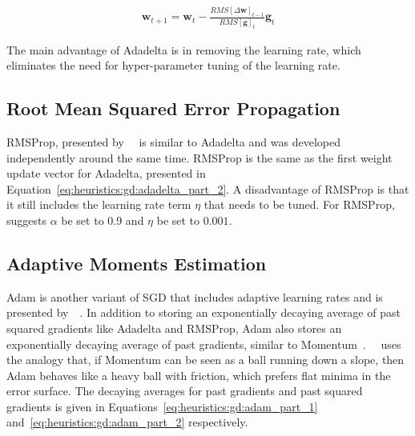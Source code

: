 \begin{equation}
	\label{eq:heuristics:gd:adadelta_part_6}
	\begin{split}
		\boldsymbol{w}_{t+1} = \boldsymbol{w}_{t} - \frac{RMS[\Delta \boldsymbol{w}]_{t-1}}{RMS[\boldsymbol{g}]_{t}} \boldsymbol{g}_{t}
	\end{split}
\end{equation}

The main advantage of \acs{Adadelta} is in removing the learning rate, which eliminates the need for hyper-parameter tuning of the learning rate.

\subsection{Root Mean Squared Error Propagation}\label{sec:heuristics:rmsprop}

\Acf{RMSProp}, presented by~\citeauthor{ref:hinton:2012}~\cite{ref:hinton:2012} is similar to \acs{Adadelta}  and was developed independently around the same time. \acs{RMSProp} is the same as the first weight update vector for \acs{Adadelta}, presented in Equation~\eqref{eq:heuristics:gd:adadelta_part_2}. A disadvantage of \acs{RMSProp} is that it still includes the learning rate term $\eta$ that needs to be tuned. For \acs{RMSProp},~\citeauthor{ref:hinton:2012}~\cite{ref:hinton:2012} suggests $\alpha$ be set to 0.9 and $\eta$ be set to $0.001$.


\subsection{Adaptive Moments Estimation}\label{sec:heuristics:adam}

\Acf{Adam} is another variant of \acs{SGD} that includes adaptive learning rates and is presented by~\citeauthor{ref:kingma:2014}~\cite{ref:kingma:2014}. In addition to storing an exponentially decaying average of past squared gradients like \acs{Adadelta} and \acs{RMSProp}, \acs{Adam} also stores an exponentially decaying average of past gradients, similar to \acs{Momentum}~\cite{ref:ruder:2016}.~\citeauthor{ref:heusel:2017}~\cite{ref:heusel:2017} uses the analogy that, if \acs{Momentum} can be seen as a ball running down a slope, then \acs{Adam} behaves like a heavy ball with friction, which prefers flat minima in the error surface. The decaying averages for past gradients and past squared gradients is given in Equations~\eqref{eq:heuristics:gd:adam_part_1} and~\eqref{eq:heuristics:gd:adam_part_2} respectively.

